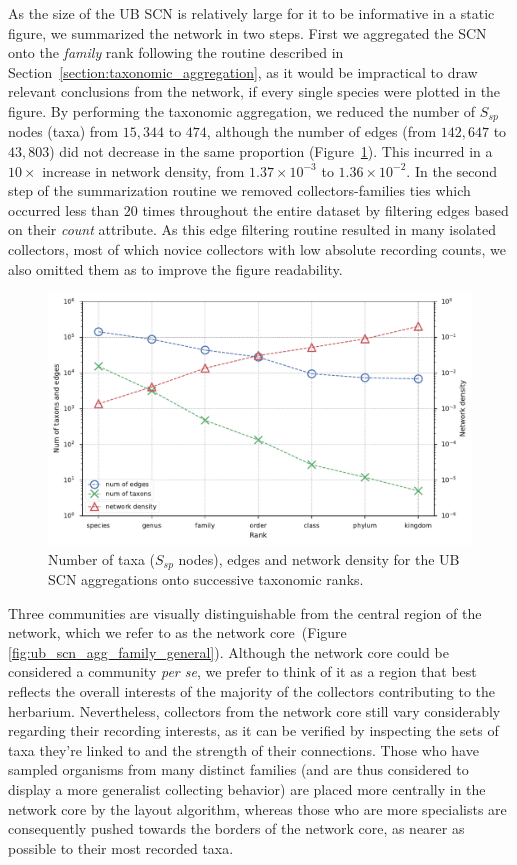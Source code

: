 As the size of the UB SCN is relatively large for it to be informative in a static figure, we summarized the network in two steps.
First we aggregated the SCN onto the \textit{family} rank following the routine described in Section~\ref{section:taxonomic_aggregation}, as it would be impractical to draw relevant conclusions from the network, if every single species were plotted in the figure.
By performing the taxonomic aggregation, we reduced the number of $S_{sp}$ nodes (taxa) from $15,344$ to $474$, although the number of edges (from $142,647$ to $43,803$) did not decrease in the same proportion (Figure~\ref{fig:ub_scn_tax_agg_curves}).
This incurred in a $10 \times$ increase in network density, from $1.37\times 10^{-3}$ to $1.36\times 10^{-2}$.
In the second step of the summarization routine we removed collectors-families ties which occurred less than $20$ times throughout the entire dataset by filtering edges based on their \textit{count} attribute.
As this edge filtering routine resulted in many isolated collectors, most of which novice collectors with low absolute recording counts, we also omitted them as to improve the figure readability.

\begin{figure}[!ht]
  	\centering
    \includegraphics[width=\linewidth]{figures/casestudy_ub/scn_tax_agg_curves.pdf}
    \caption{Number of taxa ($S_{sp}$ nodes), edges and network density for the UB SCN aggregations onto successive taxonomic ranks.}
    \label{fig:ub_scn_tax_agg_curves}
  \end{figure}

Three communities are visually distinguishable from the central region of the network, which we refer to as the network core~(Figure \ref{fig:ub_scn_agg_family_general}).
Although the network core could be considered a community \textit{per se}, we prefer to think of it as a region that best reflects the overall interests of the majority of the collectors contributing to the herbarium.
Nevertheless, collectors from the network core still vary considerably regarding their recording interests, as it can be verified by inspecting the sets of taxa they're linked to and the strength of their connections. 
Those who have sampled organisms from many distinct families (and are thus considered to display a more generalist collecting behavior) are placed more centrally in the network core by the layout algorithm, whereas those who are more specialists are consequently pushed towards the borders of the network core, as nearer as possible to their most recorded taxa.


